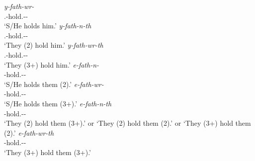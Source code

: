 \begin{exe}
\ex
\begin{xlist}
	\ex
	\gll \emph{y-fath-wr-\Zero}\\
	\Tsg.\Masc-hold.\Ext-\Ndu-\Stsg\\
	\trans `S/He holds him.'
	\label{ex215}
	\ex
	\gll \emph{y-fath-n-th}\\
	\Tsg.\Masc-hold.\Ext-\Du-\Stnsg\\
	\trans `They (2) hold him.'
	\label{ex216}
	\ex
	\gll \emph{y-fath-wr-th}\\
	\Tsg.\Masc-hold.\Ext-\Ndu-\Stnsg\\
	\trans `They (3+) hold him.'
	\label{ex217}
	\ex
	\gll \emph{e-fath-n-\Zero}\\
	\Stnsg-hold.\Ext-\Du-\Stsg\\
	\trans `S/He holds them (2).'
	\label{ex218}
	\ex
	\gll \emph{e-fath-wr-\Zero}\\
	\Stnsg-hold.\Ext-\Ndu-\Stsg\\
	\trans `S/He holds them (3+).'
	\label{ex221}
	\ex
	\gll \emph{e-fath-n-th}\\
	\Stnsg-hold.\Ext-\Du-\Stnsg\\
	\trans `They (2) hold them (3+).' or `They (2) hold them (2).' or `They (3+) hold them (2).'
	\label{ex219}
	\ex
	\gll \emph{e-fath-wr-th}\\
	\Stnsg-hold.\Ext-\Ndu-\Stnsg\\
	\trans `They (3+) hold them (3+).'
	\label{ex220}
\end{xlist}
\end{exe}

